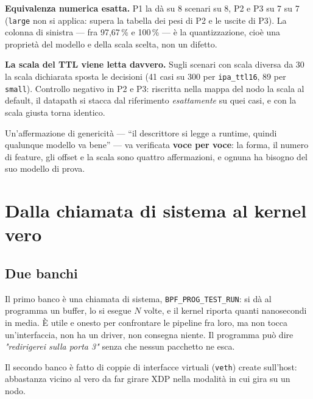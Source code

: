\documentclass[11pt,a4paper,oneside]{report}
\begin{document}
\textbf{Equivalenza numerica esatta.} P1 la dà su 8 scenari su 8, P2 e P3 su 7
su 7 (\texttt{large} non si applica: supera la tabella dei pesi di P2 e le
uscite di P3). La colonna di sinistra --- fra 97,67\,\% e 100\,\% --- è la
quantizzazione, cioè una proprietà del modello e della scala scelta, non un
difetto.

\textbf{La scala del TTL viene letta davvero.} Sugli scenari con scala diversa
da 30 la scala dichiarata sposta le decisioni (41 casi su 300 per
\texttt{ipa\_ttl16}, 89 per \texttt{small}). Controllo negativo in P2 e P3:
riscritta nella mappa del nodo la scala al default, il datapath si stacca dal
riferimento \emph{esattamente} su quei casi, e con la scala giusta torna
identico.

\begin{lezione}
Un'affermazione di genericità --- ``il descrittore si legge a runtime, quindi
qualunque modello va bene'' --- va verificata \textbf{voce per voce}: la forma,
il numero di feature, gli offset e la scala sono quattro affermazioni, e ognuna
ha bisogno del suo modello di prova.
\end{lezione}

\chapter{Dalla chiamata di sistema al kernel vero}

\section{Due banchi}

Il primo banco è una chiamata di sistema, \mbox{\texttt{BPF\_PROG\_TEST\_RUN}}:
si dà al programma un buffer, lo si esegue $N$ volte, e il kernel riporta quanti
nanosecondi in media. È utile e onesto per confrontare le pipeline fra loro, ma
non tocca un'interfaccia, non ha un driver, non consegna niente. Il programma
può dire \emph{"redirigerei sulla porta 3"} senza che nessun pacchetto ne esca.

Il secondo banco è fatto di coppie di interfacce virtuali (\texttt{veth}) create
sull'host: abbastanza vicino al vero da far girare XDP nella modalità in cui
gira su un nodo.
\end{document}
